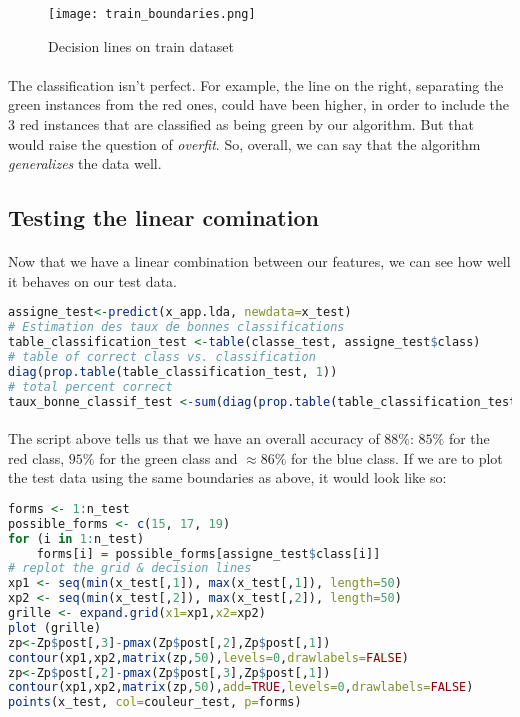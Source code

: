 \clearpage

\begin{figure}[H]
    \centering
    \texttt{[image: train\_boundaries.png]}
    \caption{Decision lines on train dataset}
\end{figure}

\paragraph{}
The classification isn't perfect.
For example, the line on the right, separating the green instances from the red ones, could have been higher, in order to include the 3 red instances that are classified as being green by our algorithm.
But that would raise the question of \emph{overfit}.
So, overall, we can say that the algorithm \emph{generalizes} the data well.

\subsection{Testing the linear comination}
\paragraph{}
Now that we have a linear combination between our features, we can see how well it behaves on our test data.

\label{accuracy-calculation}
\begin{lstlisting}[language=R, caption=Predicting with LDA]
assigne_test<-predict(x_app.lda, newdata=x_test)
# Estimation des taux de bonnes classifications
table_classification_test <-table(classe_test, assigne_test$class)
# table of correct class vs. classification
diag(prop.table(table_classification_test, 1))
# total percent correct
taux_bonne_classif_test <-sum(diag(prop.table(table_classification_test)))
\end{lstlisting}

\paragraph{}
The script above tells us that we have an overall accuracy of $88\%$: $85\%$ for the red class, $95\%$ for the green class and $\approx 86\%$ for the blue class.
If we are to plot the test data using the same boundaries as above, it would look like so:

\begin{lstlisting}[language=R, caption=Plotting predictions and true classes]
forms <- 1:n_test
possible_forms <- c(15, 17, 19)
for (i in 1:n_test)
    forms[i] = possible_forms[assigne_test$class[i]]
# replot the grid & decision lines
xp1 <- seq(min(x_test[,1]), max(x_test[,1]), length=50)
xp2 <- seq(min(x_test[,2]), max(x_test[,2]), length=50)
grille <- expand.grid(x1=xp1,x2=xp2)
plot (grille)
zp<-Zp$post[,3]-pmax(Zp$post[,2],Zp$post[,1])
contour(xp1,xp2,matrix(zp,50),levels=0,drawlabels=FALSE)
zp<-Zp$post[,2]-pmax(Zp$post[,3],Zp$post[,1])
contour(xp1,xp2,matrix(zp,50),add=TRUE,levels=0,drawlabels=FALSE)
points(x_test, col=couleur_test, p=forms)
\end{lstlisting}

